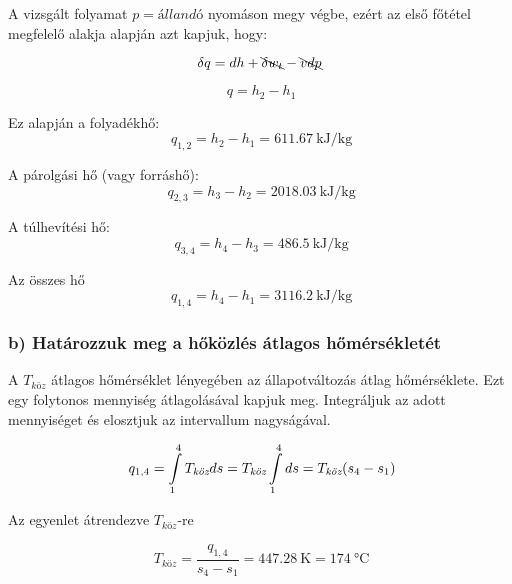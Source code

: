 A vizsgált folyamat $p = {\textit{állandó}}$ nyomáson megy végbe, ezért az első főtétel megfelelő alakja alapján  azt kapjuk, hogy:

\begin{equation}
\delta q = dh + \bcancel{\delta w_t}-\bcancel{vdp}
\end{equation}

\begin{equation}
\ q = h_2-h_1
\end{equation}

Ez alapján a folyadékhő:
\begin{equation}
\ q_{1,2} = h_2-h_1 = \SI{611,67}{\kilo\joule\per\kilogram}
\end{equation}

A párolgási hő (vagy forráshő):
\begin{equation}
\ q_{2,3} = h_3-h_2 = \SI{2018,03}{\kilo\joule\per\kilogram}
\end{equation}

A túlhevítési hő:
\begin{equation}
\ q_{3,4} = h_4-h_3 = \SI{486,5}{\kilo\joule\per\kilogram}
\end{equation}

Az összes hő
\begin{equation}
\ q_{1,4} = h_4-h_1 = \SI{3116,2}{\kilo\joule\per\kilogram}
\end{equation}

\subsubsection*{b) Határozzuk meg a hőközlés átlagos hőmérsékletét}

A $T_{\textit{köz}}$ átlagos hőmérséklet lényegében az állapotváltozás átlag hőmérséklete. Ezt egy folytonos mennyiség átlagolásával kapjuk meg. Integráljuk az adott mennyiséget és elosztjuk az intervallum nagyságával. 

\begin{equation*}
\ q_{1,4} = \int\displaylimits_{1}^{4} T_{\textit{köz}} ds = T_{\textit{köz}} \int\displaylimits_{1}^{4} ds = T_{\textit{köz}} (s_4-s_1)
\end{equation*}

Az egyenlet átrendezve $T_{\textit{köz}}$-re

\begin{equation}
\ T_{\textit{köz}} = \frac{q_{1,4}}{s_4-s_1} = \SI{447,28}{\kelvin} = \SI{174}{\celsius}
\end{equation}

